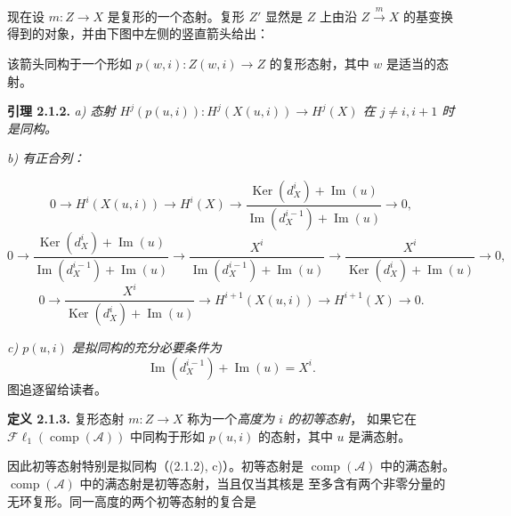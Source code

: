 \clearpage
{}%
\begingroup\small\setlength{\parskip}{0pt}\setlength{\emergencystretch}{1.5em}
\setlength{\abovedisplayskip}{4pt plus 2pt minus 2pt}%
\setlength{\belowdisplayskip}{4pt plus 2pt minus 2pt}%

现在设 $m\colon Z\longrightarrow X$ 是复形的一个态射。复形 $Z'$ 显然是
$Z$ 上由沿 $Z\xrightarrow{m}X$ 的基变换得到的对象，并由下图中左侧的竖直箭头给出：

\begin{center}
\end{center}
该箭头同构于一个形如 $p(w,i)\colon Z(w,i)\longrightarrow Z$ 的复形态射，其中
$w$ 是适当的态射。

\medskip\noindent\textbf{引理 2.1.2.}\quad
\textit{a) 态射
$H^j(p(u,i))\colon H^j(X(u,i))\longrightarrow H^j(X)$ 在
$j\neq i,i+1$ 时是同构。}

\noindent\textit{b) 有正合列：}

\[
0\longrightarrow H^i(X(u,i))\longrightarrow H^i(X)
\longrightarrow
\frac{\operatorname{Ker}(d_X^i)+\operatorname{Im}(u)}
     {\operatorname{Im}(d_X^{i-1})+\operatorname{Im}(u)}
\longrightarrow0,
\]
\[
0\longrightarrow
\frac{\operatorname{Ker}(d_X^i)+\operatorname{Im}(u)}
     {\operatorname{Im}(d_X^{i-1})+\operatorname{Im}(u)}
\longrightarrow
\frac{X^i}{\operatorname{Im}(d_X^{i-1})+\operatorname{Im}(u)}
\longrightarrow
\frac{X^i}{\operatorname{Ker}(d_X^i)+\operatorname{Im}(u)}
\longrightarrow0,
\]
\[
0\longrightarrow
\frac{X^i}{\operatorname{Ker}(d_X^i)+\operatorname{Im}(u)}
\longrightarrow H^{i+1}(X(u,i))\longrightarrow H^{i+1}(X)
\longrightarrow0.
\]

\noindent\textit{c) $p(u,i)$ 是拟同构的充分必要条件为}
\[
\operatorname{Im}(d_X^{i-1})+\operatorname{Im}(u)=X^i.
\]
图追逐留给读者。

\medskip\noindent\textbf{定义 2.1.3.}\quad
复形态射 $m\colon Z\longrightarrow X$ 称为一个\emph{高度为 $i$ 的初等态射}，
如果它在 $\mathcal{F}\ell_1(\operatorname{comp}(\mathcal A))$ 中同构于形如
$p(u,i)$ 的态射，其中 $u$ 是满态射。

因此初等态射特别是拟同构（(2.1.2), c)）。初等态射是
$\operatorname{comp}(\mathcal A)$ 中的满态射。
$\operatorname{comp}(\mathcal A)$ 中的满态射是初等态射，当且仅当其核是
至多含有两个非零分量的无环复形。同一高度的两个初等态射的复合是
\endgroup
